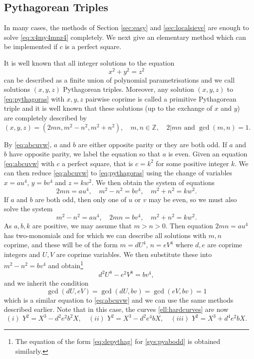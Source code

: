 \documentclass[a4paper,12pt,english,reqno]{amsart}
\begin{document}
\subsection{Pythagorean Triples}\label{sec:pythag}
In many cases, the methods of Section \ref{sec:easy} and \ref{sec:localsieve} are enough to solve \eqref{eq:x4my4mnz4} completely. We next give an elementary method which can be implemented if $c$ is a perfect square.

It is well known that all integer solutions to the equation
\begin{equation}\label{eq:pythagoras}
x^2+y^2=z^2
\end{equation} 
can be described as a finite union of polynomial parametrisations and we call solutions $(x,y,z)$ Pythagorean triples.
Moreover, any solution $(x,y,z)$ to \eqref{eq:pythagoras} with $x,y,z$ pairwise coprime is called a primitive Pythagorean triple and it is well known \cite{mainbook} that these solutions (up to the exchange of $x$ and $y$) are completely described by
\begin{equation}\label{sol:pythag}
(x,y,z)=(2mn,m^2-n^2,m^2+n^2), \quad m,n \in \mathbb{Z}, \quad 2|mn \text{ and } \gcd(m,n)=1.
\end{equation}

By \eqref{eq:abcuvw}, $a$ and $b$ are either opposite parity or they are both odd. If $a$ and $b$ have opposite parity, we label the equation so that $a$ is even.
Given an equation \eqref{eq:abcuvw} with $c$ a perfect square, that is $c=k^2$ for some positive integer $k$. We can then reduce \eqref{eq:abcuvw} to \eqref{eq:pythagoras} using the change of variables $x=au^4$, $y=bv^4$ and $z=kw^2$. We then obtain the system of equations 
\begin{equation}\label{sys:pyabopp}
2mn=au^4, \quad m^2-n^2=bv^4, \quad m^2+n^2=kw^2.
\end{equation}
If $a$ and $b$ are both odd, then only one of $u$ or $v$ may be even, so we must also solve the system
\begin{equation}\label{sys:pyabodd}
m^2-n^2=au^4, \quad 2mn=bv^4, \quad m^2+n^2=kw^2.
\end{equation}
As $a,b,k$ are positive, we may assume that $m>n>0$. Then equation $2mn=au^4$ has two-monomials and for which we can describe all solutions with $m,n$ coprime, and these will be of the form $m=dU^4$, $n=eV^4$ where $d,e$ are coprime integers and $U,V$ are coprime variables. We then substitute these into $m^2-n^2=bv^4$ and obtain\footnote{The equation of the form \eqref{eq:depythag} for \eqref{sys:pyabodd} is obtained similarly.}
\begin{equation}\label{eq:depythag}
d^2U^8-e^2V^8=bv^4,
\end{equation}
and we inherit the condition
\begin{equation}\label{cond:depythag}
\gcd(dU, eV) = \gcd(dU, bv) = \gcd(eV, bv) = 1
\end{equation}
which is a similar equation to \eqref{eq:abcuvw} and we can use the same methods described earlier. Note that in this case, the curves \eqref{ell:hardcurves} are now
$$
(i) \,\, Y^2=X^3-d^2e^2b^2X, \quad (ii) \,\, Y^2=X^3-d^2e^4bX, \quad (iii) \,\, Y^2=X^3+d^4e^2bX.
$$
\end{document}
